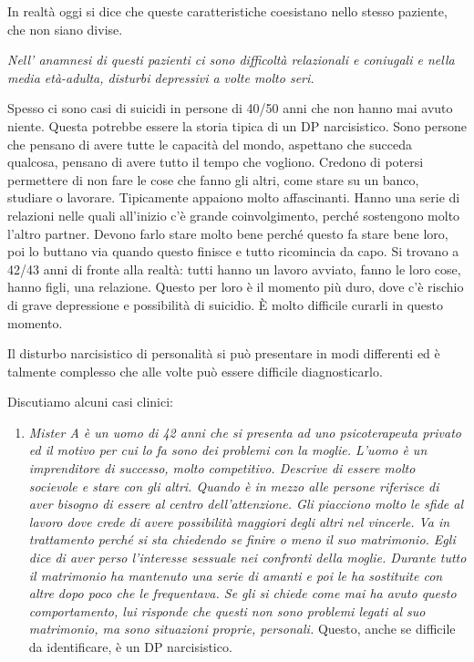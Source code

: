 \documentclass[]{article}
\begin{document}
In realtà oggi si dice che queste caratteristiche coesistano nello
stesso paziente, che non siano divise.

\emph{\emph{Nell' anamnesi di questi pazienti ci sono difficoltà
relazionali e coniugali e nella media età-adulta, disturbi depressivi a
volte molto seri. }}

Spesso ci sono casi di suicidi in persone di 40/50 anni che non hanno
mai avuto niente. Questa potrebbe essere la storia tipica di un DP
narcisistico. Sono persone che pensano di avere tutte le capacità del
mondo, aspettano che succeda qualcosa, pensano di avere tutto il tempo
che vogliono. Credono di potersi permettere di non fare le cose che
fanno gli altri, come stare su un banco, studiare o lavorare.
Tipicamente appaiono molto affascinanti. Hanno una serie di relazioni
nelle quali all'inizio c'è grande coinvolgimento, perché sostengono
molto l'altro partner. Devono farlo stare molto bene perché questo fa
stare bene loro, poi lo buttano via quando questo finisce e tutto
ricomincia da capo. Si trovano a 42/43 anni di fronte alla realtà: tutti
hanno un lavoro avviato, fanno le loro cose, hanno figli, una relazione.
Questo per loro è il momento più duro, dove c'è rischio di grave
depressione e possibilità di suicidio. È molto difficile curarli in
questo momento.

Il disturbo narcisistico di personalità si può presentare in modi
differenti ed è talmente complesso che alle volte può essere difficile
diagnosticarlo.

Discutiamo alcuni casi clinici:

\begin{enumerate}
\def\labelenumi{\arabic{enumi}.}
\item
  \emph{Mister A è un uomo di 42 anni che si presenta ad uno
  psicoterapeuta privato ed il motivo per cui lo fa sono dei problemi
  con la moglie. L'uomo è un imprenditore di successo, molto
  competitivo. Descrive di essere molto socievole e stare con gli altri.
  Quando è in mezzo alle persone riferisce di aver bisogno di essere al
  centro dell'attenzione. Gli piacciono molto le sfide al lavoro dove
  crede di avere possibilità maggiori degli altri nel vincerle. Va in
  trattamento perché si sta chiedendo se finire o meno il suo
  matrimonio. Egli dice di aver perso l'interesse sessuale nei confronti
  della moglie. Durante tutto il matrimonio ha mantenuto una serie di
  amanti e poi le ha sostituite con altre dopo poco che le frequentava.
  Se gli si chiede come mai ha avuto questo comportamento, lui risponde
  che questi non sono problemi legati al suo matrimonio, ma sono
  situazioni proprie, personali.} Questo, anche se difficile da
  identificare, è un DP narcisistico.
\end{enumerate}
\end{document}
